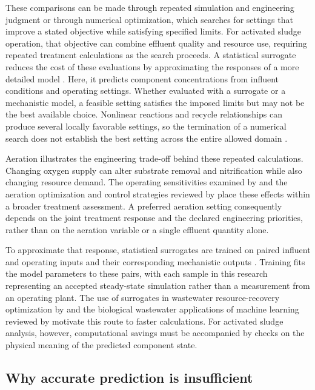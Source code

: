 These comparisons can be made through repeated simulation and engineering judgment or through numerical optimization, which searches for settings that improve a stated objective while satisfying specified limits. For activated sludge operation, that objective can combine effluent quality and resource use, requiring repeated treatment calculations as the search proceeds. A statistical surrogate reduces the cost of these evaluations by approximating the responses of a more detailed model \citep{BhosekarIerapetritou2018,McBride2019}. Here, it predicts component concentrations from influent conditions and operating settings. Whether evaluated with a surrogate or a mechanistic model, a feasible setting satisfies the imposed limits but may not be the best available choice. Nonlinear reactions and recycle relationships can produce several locally favorable settings, so the termination of a numerical search does not establish the best setting across the entire allowed domain \citep{Araujo2013,BuzziFerraris2013}.

Aeration illustrates the engineering trade-off behind these repeated calculations. Changing oxygen supply can alter substrate removal and nitrification while also changing resource demand. The operating sensitivities examined by \citet{Araujo2013} and the aeration optimization and control strategies reviewed by \citet{Gu2023} place these effects within a broader treatment assessment. A preferred aeration setting consequently depends on the joint treatment response and the declared engineering priorities, rather than on the aeration variable or a single effluent quantity alone.

To approximate that response, statistical surrogates are trained on paired influent and operating inputs and their corresponding mechanistic outputs \citep{Fang2011,Selerio2026}. Training fits the model parameters to these pairs, with each sample in this research representing an accepted steady-state simulation rather than a measurement from an operating plant. The use of surrogates in wastewater resource-recovery optimization by \citet{Durkin2024} and the biological wastewater applications of machine learning reviewed by \citet{Sundui2021} motivate this route to faster calculations. For activated sludge analysis, however, computational savings must be accompanied by checks on the physical meaning of the predicted component state.

\subsection{Why accurate prediction is insufficient}

